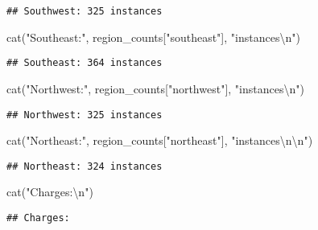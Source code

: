 \documentclass[
]{article}
\newenvironment{Shaded}{\begin{snugshade}}{\end{snugshade}}
\newcommand{\FunctionTok}[1]{\textcolor[rgb]{0.00,0.00,0.00}{#1}}
\newcommand{\NormalTok}[1]{#1}
\newcommand{\SpecialCharTok}[1]{\textcolor[rgb]{0.00,0.00,0.00}{#1}}
\newcommand{\StringTok}[1]{\textcolor[rgb]{0.31,0.60,0.02}{#1}}
\begin{document}
\begin{verbatim}
## Southwest: 325 instances
\end{verbatim}

\begin{Shaded}
\begin{Highlighting}[]
\FunctionTok{cat}\NormalTok{(}\StringTok{"Southeast:"}\NormalTok{, region\_counts[}\StringTok{"southeast"}\NormalTok{], }\StringTok{"instances}\SpecialCharTok{\textbackslash{}n}\StringTok{"}\NormalTok{)}
\end{Highlighting}
\end{Shaded}

\begin{verbatim}
## Southeast: 364 instances
\end{verbatim}

\begin{Shaded}
\begin{Highlighting}[]
\FunctionTok{cat}\NormalTok{(}\StringTok{"Northwest:"}\NormalTok{, region\_counts[}\StringTok{"northwest"}\NormalTok{], }\StringTok{"instances}\SpecialCharTok{\textbackslash{}n}\StringTok{"}\NormalTok{)}
\end{Highlighting}
\end{Shaded}

\begin{verbatim}
## Northwest: 325 instances
\end{verbatim}

\begin{Shaded}
\begin{Highlighting}[]
\FunctionTok{cat}\NormalTok{(}\StringTok{"Northeast:"}\NormalTok{, region\_counts[}\StringTok{"northeast"}\NormalTok{], }\StringTok{"instances}\SpecialCharTok{\textbackslash{}n\textbackslash{}n}\StringTok{"}\NormalTok{)}
\end{Highlighting}
\end{Shaded}

\begin{verbatim}
## Northeast: 324 instances
\end{verbatim}

\begin{Shaded}
\begin{Highlighting}[]
\FunctionTok{cat}\NormalTok{(}\StringTok{"Charges:}\SpecialCharTok{\textbackslash{}n}\StringTok{"}\NormalTok{)}
\end{Highlighting}
\end{Shaded}

\begin{verbatim}
## Charges:
\end{verbatim}
\end{document}
